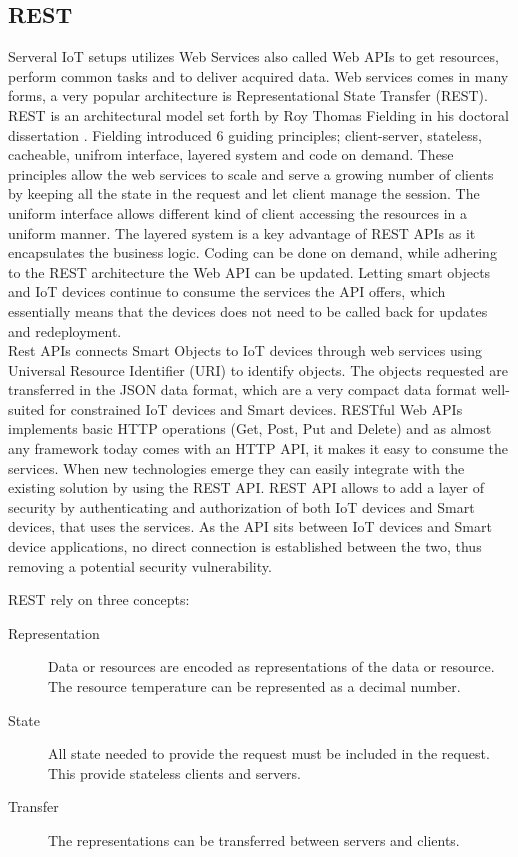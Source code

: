 \subsection{REST}
Serveral IoT setups utilizes Web Services also called Web APIs to get resources, perform common tasks and to deliver acquired data. Web services comes in many forms, a very popular architecture is Representational State Transfer (REST). REST is an architectural model set forth by Roy Thomas Fielding in his doctoral dissertation \cite{Fielding}. Fielding introduced 6 guiding principles; client-server, stateless, cacheable, unifrom interface, layered system and code on demand. These principles allow the web services to scale and serve a growing number of clients by keeping all the state in the request and let client manage the session. The uniform interface allows different kind of client accessing the resources in a uniform manner. The layered system is a key advantage of REST APIs as it encapsulates the business logic. Coding can be done on demand, while adhering to the REST architecture the Web API can be updated. Letting smart objects and IoT devices continue to consume the services the API offers, which essentially means that the devices does not need to be called back for updates and redeployment. \\

Rest APIs connects Smart Objects to IoT devices through web services using Universal Resource Identifier (URI) to identify objects. The objects requested are transferred in the JSON data format, which are a very compact data format well-suited for constrained IoT devices and Smart devices. RESTful Web APIs implements basic HTTP operations (Get, Post, Put and Delete) and as almost any framework today comes with an HTTP API, it makes it easy to consume the services. When new technologies emerge they can easily integrate with the existing solution by using the REST API. REST API allows to add a layer of security by authenticating and authorization of both IoT devices and Smart devices, that uses the services. As the API sits between IoT devices and Smart device applications, no direct connection is established between the two, thus removing a potential security vulnerability.

REST rely on three concepts: 
\begin{description}
    \item[Representation] Data or resources are encoded as representations of the data or resource. The resource temperature can be represented as a decimal number.
    \item[State] All state needed to provide the request must be included in the request. This provide stateless clients and servers. 
    \item[Transfer] The representations can be transferred between servers and clients.
    \cite{smartthings} 
\end{description} 
